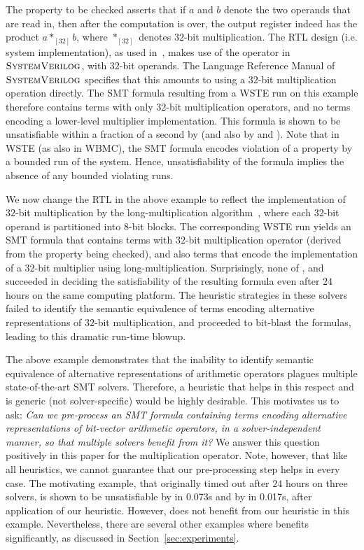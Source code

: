 The property to be checked asserts that if $a$ and $b$ denote the two
operands that are read in, then after the computation is over, the
output register indeed has the product $a *_{[32]} b$, where
$*_{[32]}$ denotes $32$-bit multiplication.  The RTL design
(i.e. system implementation), as used in~\cite{wste}, makes use of the
{\tt *} operator in $\textsc{SystemVerilog}$, with $32$-bit operands.  The Language
Reference Manual of $\textsc{SystemVerilog}$ specifies that this amounts to using a
$32$-bit multiplication operation directly.  The SMT formula resulting
from a WSTE run on this example therefore contains terms with only
$32$-bit multiplication operators, and no terms encoding a lower-level
multiplier implementation.  This formula is shown to be unsatisfiable
within a fraction of a second by {\boolector} (and also by {\cvcfour}
and {\zthree}).  Note that in WSTE (as also in WBMC), the SMT formula
encodes violation of a property by a bounded run of the system. Hence,
unsatisfiability of the formula implies the absence of any bounded
violating runs.

We now change the RTL in the above example to reflect the
implementation of $32$-bit multiplication by the long-multiplication
algorithm~\cite{long}, where each $32$-bit operand is partitioned into
$8$-bit blocks.  The corresponding WSTE run yields an SMT formula that
contains terms with $32$-bit multiplication operator (derived from the
property being checked), and also terms that encode the implementation
of a $32$-bit multiplier using long-multiplication.  Surprisingly, none
of {\boolector}, {\cvcfour} and {\zthree} succeeded in deciding the
satisfiability of the resulting formula even after $24$ hours on the
same computing platform.  The heuristic strategies in these solvers
failed to identify the semantic equivalence of terms encoding
alternative representations of $32$-bit multiplication, and proceeded
to bit-blast the formulas, leading to this dramatic run-time blowup.

The above example demonstrates that the inability to identify semantic
equivalence of alternative representations of arithmetic operators
plagues multiple state-of-the-art SMT solvers.  Therefore, a heuristic
that helps in this respect and is generic (not solver-specific) would
be highly desirable.  This motivates us to ask: \emph{Can we
pre-process an SMT formula containing terms encoding alternative
representations of bit-vector arithmetic operators, in a
solver-independent manner, so that multiple solvers benefit from it?}
We answer this question positively in this paper for the
multiplication operator.  Note, however, that like all heuristics, we
cannot guarantee that our pre-processing step helps in every case.
The motivating example, that originally timed out after $24$ hours on
three solvers, is shown to be unsatisfiable by {\zthree} in 0.073s and
by {\cvcfour} in 0.017s, after application of our heuristic. However,
{\boolector} does not benefit from our heuristic in this example.
Nevertheless, there are several other examples where {\boolector}
benefits significantly, as discussed in Section~\ref{sec:experiments}.

